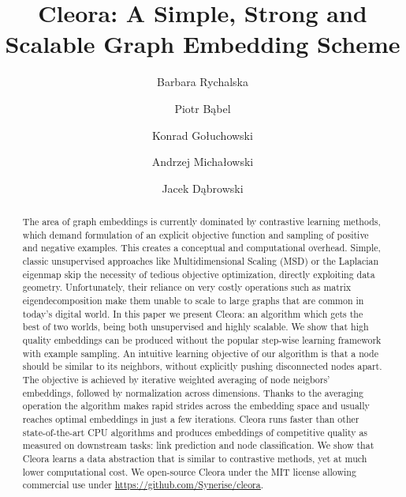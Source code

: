 \documentclass{IEEEtran}
\begin{document}
\title{Cleora: A Simple, Strong and Scalable Graph Embedding Scheme}

\author[12]{Barbara Rychalska}
\author[1]{Piotr Bąbel}
\author[1]{Konrad Gołuchowski}
\author[1]{Andrzej Michałowski}
\author[1]{Jacek Dąbrowski}

\maketitle


\begin{abstract}
The area of graph embeddings is currently dominated by contrastive learning methods, which demand formulation of an explicit objective function and sampling of positive and negative examples. This creates a conceptual and computational overhead. Simple, classic unsupervised approaches like Multidimensional Scaling (MSD) or the Laplacian eigenmap skip the necessity of tedious objective optimization, directly exploiting data geometry. Unfortunately, their reliance on very costly operations such as matrix eigendecomposition make them unable to scale to large graphs that are common in today's digital world. In this paper we present Cleora: an algorithm which gets the best of two worlds, being both unsupervised and highly scalable. We show that high quality embeddings can be produced without the popular step-wise learning framework with example sampling. An intuitive learning objective of our algorithm is that a node should be similar to its neighbors, without explicitly pushing disconnected nodes apart. The objective is achieved by iterative weighted averaging of node neigbors' embeddings, followed by normalization across dimensions. Thanks to the averaging operation the algorithm makes rapid strides across the embedding space and usually reaches optimal embeddings in just a few iterations. Cleora runs faster than other state-of-the-art CPU algorithms and produces embeddings of competitive quality as measured on downstream tasks: link prediction and node classification. We show that Cleora learns a data abstraction that is similar to contrastive methods, yet at much lower computational cost. We open-source Cleora under the MIT license allowing commercial use under  \underline{\url{https://github.com/Synerise/cleora}}.
\end{abstract}
\end{document}
